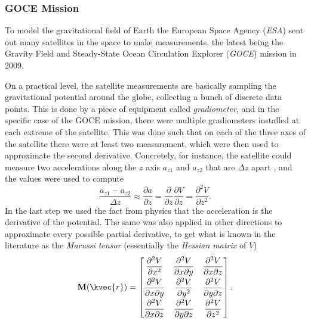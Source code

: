 \subsubsection{GOCE Mission}

To model the gravitational field of Earth the European Space Agency (\emph{ESA}) sent
out many satellites in the space to make measurements, the latest being the Gravity
Field and Steady-State Ocean Circulation Explorer (\emph{GOCE}) mission in 2009.

On a practical level, the satellite measurements are basically sampling the
gravitational potential around the globe, collecting a bunch of discrete data
points. This is done by a piece of equipment called \emph{gradiometer}, and in the
specific case of the GOCE mission, there were multiple gradiometers installed at
each extreme of the satellite. This was done such that on each of the three axes
of the satellite there were at least two measurement, which were then used to
approximate the second derivative. Concretely, for instance, the satellite could
measure two accelerations along the $z$ axis $a_{z1}$ and $a_{z2}$ that are
$\Delta z$ apart , and the values were used to compute
\begin{equation*}
  \frac{a_{z1} - a_{z2}}{\Delta z}
  \approx \frac{\partial a}{\partial z}
  = \frac{\partial}{\partial z} \frac{\partial V}{\partial z}
  = \frac{\partial^2 V}{\partial z^2}.
\end{equation*}
In the last step we used the fact from physics that the acceleration is the
derivative of the potential.  The same was also applied in other directions to
approximate every possible partial derivative, to get what is known in the
literature as the \emph{Marussi tensor} (essentially the \emph{Hessian matrix} of $V$)
\begin{equation*}
  \mathbf{M}(\kvec{r}) = \begin{bmatrix}
    \dfrac{\partial^2 V}{\partial x^2} &
    \dfrac{\partial^2 V}{\partial x \partial y} &
    \dfrac{\partial^2 V}{\partial x \partial z} \\[0.7em]
    \dfrac{\partial^2 V}{\partial x \partial y} &
    \dfrac{\partial^2 V}{\partial y^2} &
    \dfrac{\partial^2 V}{\partial y \partial z} \\[0.7em]
    \dfrac{\partial^2 V}{\partial x \partial z} &
    \dfrac{\partial^2 V}{\partial y \partial z} &
    \dfrac{\partial^2 V}{\partial z^2}
  \end{bmatrix}.
\end{equation*}

